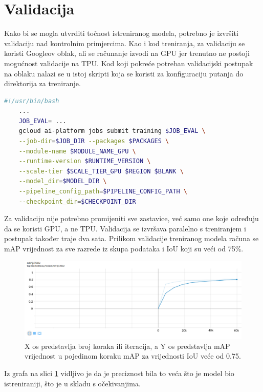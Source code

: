 \section{Validacija}
Kako bi se mogla utvrditi točnost istreniranog modela, potrebno je izvršiti validaciju nad kontrolnim primjercima. Kao i kod treniranja, za validaciju se koristi Googleov oblak, ali se računanje izvodi
na GPU jer trenutno ne postoji mogućnost validacije na TPU. Kod koji pokreće potreban validacijski postupak na oblaku nalazi se u istoj skripti koja se koristi za konfiguraciju putanja do direktorija za treniranje.

\begin{lstlisting}[language=bash, tabsize=2]
    #!/usr/bin/bash
    ...
    JOB_EVAL= ...
    gcloud ai-platform jobs submit training $JOB_EVAL \
    --job-dir=$JOB_DIR --packages $PACKAGES \
    --module-name $MODULE_NAME_GPU \
    --runtime-version $RUNTIME_VERSION \
    --scale-tier $SCALE_TIER_GPU $REGION $BLANK \
    --model_dir=$MODEL_DIR \
    --pipeline_config_path=$PIPELINE_CONFIG_PATH \
    --checkpoint_dir=$CHECKPOINT_DIR
\end{lstlisting}

Za validaciju nije potrebno promijeniti sve zastavice, već samo one koje određuju da se koristi GPU, a ne TPU. Validacija se izvršava paralelno s treniranjem i postupak također traje dva sata.
Prilikom validacije treniranog modela računa se mAP vrijednost za sve razrede iz skupa podataka i IoU koji su veći od 75\%. \newline

\begin{figure}[htb]
    \centering
    \includegraphics[width=14cm]{img/eval-mAP.png}
    \caption{X os predstavlja broj koraka ili iteracija, a Y os predstavlja mAP vrijednost u pojedinom koraku mAP za vrijednosti IoU veće od 0.75.}
    \label{Eval-mAP}
\end{figure}

Iz grafa na slici \ref{Eval-mAP} vidljivo je da je preciznost bila to veća što je model bio istreniraniji, što je u skladu s očekivanjima. 

